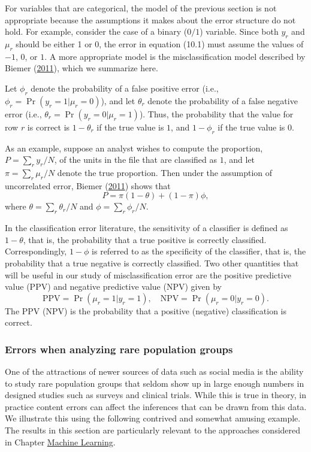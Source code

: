 \documentclass[]{krantz}
\begin{document}
For variables that are categorical, the model of the previous section is
not appropriate because the assumptions it makes about the error
structure do not hold. For example, consider the case of a binary
(\(0/1\)) variable. Since both \(y_r\) and \(\mu_r\) should be either 1
or 0, the error in equation (10.1) must assume the values of \(-1\),
\(0\), or \(1\). A more appropriate model is the misclassification model
described by Biemer (\protect\hyperlink{ref-biemer2011latent}{2011}),
which we summarize here.

Let \(\phi_r\) denote the probability of a false positive error (i.e.,
\(\phi_r = \Pr (y_r = 1\vert \mu_r = 0)\)), and let \(\theta_r\) denote
the probability of a false negative error (i.e.,
\(\theta_r =\Pr (y_r = 0\vert \mu_r = 1)\)). Thus, the probability that
the value for row \(r\) is correct is \(1 - \theta_r\) if the true value
is \(1\), and \(1 - \phi_r\) if the true value is \(0\).

As an example, suppose an analyst wishes to compute the proportion,
\(P = \sum_r {y_r / N}\), of the units in the file that are classified
as \(1\), and let \(\pi = \sum_r {\mu_r / N}\) denote the true
proportion. Then under the assumption of uncorrelated error, Biemer
(\protect\hyperlink{ref-biemer2011latent}{2011}) shows that
\[\label{eq:10-1.3}
P = \pi (1 - \theta ) + (1 - \pi )\phi,\] where
\(\theta = \sum_r {\theta_r / N}\) and \(\phi = \sum_r {\phi_r / N}\).

In the classification error literature, the sensitivity of a classifier
is defined as \(1 - \theta\), that is, the probability that a true
positive is correctly classified. Correspondingly, \(1 - \phi\) is
referred to as the specificity of the classifier, that is, the
probability that a true negative is correctly classified. Two other
quantities that will be useful in our study of misclassification error
are the positive predictive value (PPV) and negative predictive value
(NPV) given by \[\label{eq:10-1.4}
\mathrm{PPV} = \Pr (\mu_r = 1\vert y_r = 1),\quad\mathrm{NPV} = \Pr
(\mu_r = 0\vert y_r = 0).\] The PPV (NPV) is the probability that a
positive (negative) classification is correct.

\subsubsection{Errors when analyzing rare population
groups}\label{sec:10-4.2.3}

One of the attractions of newer sources of data such as social media is
the ability to study rare population groups that seldom show up in large
enough numbers in designed studies such as surveys and clinical trials.
While this is true in theory, in practice content errors can affect the
inferences that can be drawn from this data. We illustrate this using
the following contrived and somewhat amusing example. The results in
this section are particularly relevant to the approaches considered in
Chapter \protect\hyperlink{chap:ml}{Machine Learning}.
\end{document}
